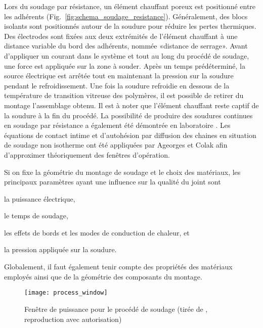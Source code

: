 Lors du soudage par résistance, un élément chauffant poreux est positionné entre les adhérents (Fig.~\ref{fig:schema_soudage_resistance}). 
Généralement, des blocs isolants sont positionnés autour de la soudure pour réduire les pertes thermiques. 
Des électrodes sont fixées aux deux extrémités de l'élément chauffant à une distance variable du bord des adhérents, nommée «distance de serrage». 
Avant d'appliquer un courant dans le système et tout au long du procédé de soudage, une force est appliquée sur la zone à souder. 
Après un temps prédéterminé, la source électrique est arrêtée tout en maintenant la pression sur la soudure pendant le refroidissement. 
Une fois la soudure refroidie en dessous de la température de transition vitreuse des polymères, il est possible de retirer du montage l'assemblage obtenu. 
Il est à noter que l'élément chauffant reste captif de la soudure à la fin du procédé. 
La possibilité de produire des soudures continues en soudage par résistance a également été démontrée en laboratoire \cite{Shi2015a}. 
Les équations de contact intime et d'autohésion par diffusion des chaines en situation de soudage non isotherme ont été appliquées par Ageorges \cite{Ageorges1998} et Colak \cite{Colak2002} afin d'approximer théoriquement des fenêtres d'opération. 

Si on fixe la géométrie du montage de soudage et le choix des matériaux, les principaux paramètres ayant une influence sur la qualité du joint sont 
\begin{inparaenum}[(1)]
	\item la puissance électrique, 
	\item le temps de soudage, 
	\item les effets de bords et les modes de conduction de chaleur, et
	\item la pression appliquée sur la soudure. 
\end{inparaenum}
Globalement, il faut également tenir compte des propriétés des matériaux employés ainsi que de la géométrie des composants du montage. 

\begin{figure}[h]
	\centering
	\texttt{[image: process\_window]}
	\caption{Fenêtre de puissance pour le procédé de soudage (tirée de \cite{Stavrov2005a}, reproduction avec autorisation)}
	\label{fig:process_window}
\end{figure}

